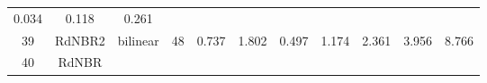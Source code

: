 \documentclass[twoside,12pt,final]{ucthesis-CA2012}
\begin{document}
\begin{ucmainmatter}
\begin{longtable}[]{@{}ccccccccccc@{}}
\begin{minipage}[t]{0.05\columnwidth}
0.034\strut
\end{minipage} & \begin{minipage}[t]{0.05\columnwidth}\centering\strut
0.118\strut
\end{minipage} & \begin{minipage}[t]{0.05\columnwidth}\centering\strut
0.261\strut
\end{minipage}\tabularnewline
\begin{minipage}[t]{0.04\columnwidth}\centering\strut
39\strut
\end{minipage} & \begin{minipage}[t]{0.11\columnwidth}\centering\strut
RdNBR2\strut
\end{minipage} & \begin{minipage}[t]{0.06\columnwidth}\centering\strut
bilinear\strut
\end{minipage} & \begin{minipage}[t]{0.08\columnwidth}\centering\strut
48\strut
\end{minipage} & \begin{minipage}[t]{0.08\columnwidth}\centering\strut
0.737\strut
\end{minipage} & \begin{minipage}[t]{0.07\columnwidth}\centering\strut
1.802\strut
\end{minipage} & \begin{minipage}[t]{0.07\columnwidth}\centering\strut
0.497\strut
\end{minipage} & \begin{minipage}[t]{0.07\columnwidth}\centering\strut
1.174\strut
\end{minipage} & \begin{minipage}[t]{0.05\columnwidth}\centering\strut
2.361\strut
\end{minipage} & \begin{minipage}[t]{0.05\columnwidth}\centering\strut
3.956\strut
\end{minipage} & \begin{minipage}[t]{0.05\columnwidth}\centering\strut
8.766\strut
\end{minipage}\tabularnewline
\begin{minipage}[t]{0.04\columnwidth}\centering\strut
40\strut
\end{minipage} & \begin{minipage}[t]{0.11\columnwidth}\centering\strut
RdNBR\strut
\end{minipage} & \begin{minipage}[t]{0.06\columnwidth}\centering\strut

\end{minipage}
\end{longtable}
\end{ucmainmatter}
\end{document}
